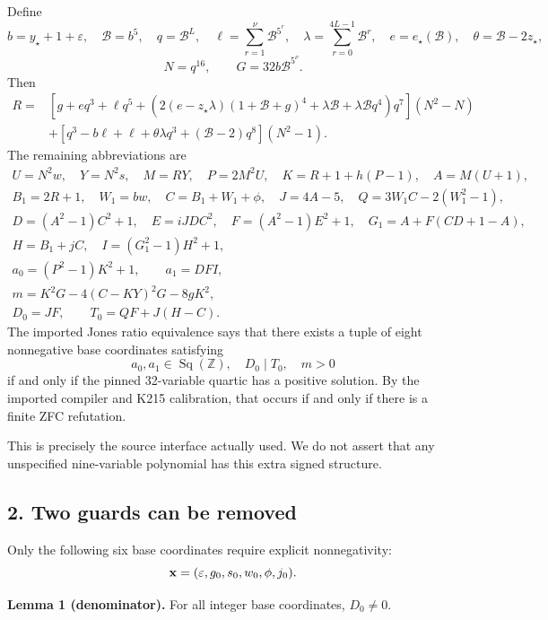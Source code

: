 Define \[
 b=y_\star+1+\varepsilon,\quad \mathcal B=b^5,\quad
 q=\mathcal B^L,\quad
 \ell=\sum_{r=1}^{\nu}\mathcal B^{5^r},\quad
 \lambda=\sum_{r=0}^{4L-1}\mathcal B^r,\quad
 e=e_\star(\mathcal B),\quad \theta=\mathcal B-2z_\star,
\] \[
 N=q^{16},\qquad G=32b\mathcal B^{5^\nu}.
\] Then \[
\begin{split}
 R={}&[g+eq^3+\ell q^5+
 (2(e-z_\star\lambda)(1+\mathcal B+g)^4+
 \lambda\mathcal B+\lambda\mathcal Bq^4)q^7](N^2-N)\\
 &+[q^3-b\ell+\ell+\theta\lambda q^3+
 (\mathcal B-2)q^8](N^2-1).
\end{split}
\] The remaining abbreviations are \[
\begin{gathered}
 U=N^2w,\quad Y=N^2s,\quad M=RY,\quad
 P=2M^2U,\quad K=R+1+h(P-1),\quad A=M(U+1),\\
 B_1=2R+1,\quad W_1=bw,\quad C=B_1+W_1+\phi,\quad
 J=4A-5,\quad Q=3W_1C-2(W_1^2-1),\\
 D=(A^2-1)C^2+1,\quad E=iJDC^2,\quad
 F=(A^2-1)E^2+1,\quad G_1=A+F(CD+1-A),\\
 H=B_1+jC,\quad I=(G_1^2-1)H^2+1,\\
 a_0=(P^2-1)K^2+1,\qquad a_1=DFI,\\
 m=K^2G-4(C-KY)^2G-8gK^2,\\
 D_0=JF,\qquad T_0=QF+J(H-C).
\end{gathered}
\] The imported Jones ratio equivalence says that there exists a tuple
of eight nonnegative base coordinates satisfying \[
 a_0,a_1\in\operatorname{Sq}(\mathbb Z),\quad D_0\mid T_0,\quad m>0
 \tag{JR}
\] if and only if the pinned 32-variable quartic has a positive
solution. By the imported compiler and K215 calibration, that occurs if
and only if there is a finite ZFC refutation.

This is precisely the source interface actually used. We do not assert
that any unspecified nine-variable polynomial has this extra signed
structure.

\hypertarget{two-guards-can-be-removed}{%
\subsection{2. Two guards can be
removed}\label{two-guards-can-be-removed}}

Only the following six base coordinates require explicit nonnegativity:
\[
 {\bf x}=(\varepsilon,g_0,s_0,w_0,\phi,j_0).
\]

\textbf{Lemma 1 (denominator).} For all integer base coordinates,
\(D_0\ne0\).

